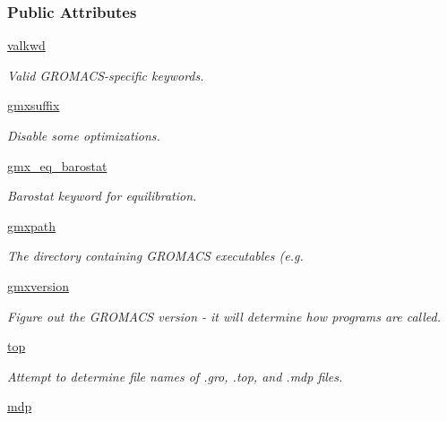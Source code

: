\subsubsection*{Public Attributes}
\begin{DoxyCompactItemize}
\item 
\hyperlink{classsrc_1_1gmxio_1_1GMX_a73bfdd122081f5fa7bd1b969f8c0992b}{valkwd}
\begin{DoxyCompactList}\small\item\em Valid G\+R\+O\+M\+A\+C\+S-\/specific keywords. \end{DoxyCompactList}\item 
\hyperlink{classsrc_1_1gmxio_1_1GMX_a0a5328567ebce344ddc08d82789b2d01}{gmxsuffix}
\begin{DoxyCompactList}\small\item\em Disable some optimizations. \end{DoxyCompactList}\item 
\hyperlink{classsrc_1_1gmxio_1_1GMX_a92135a30fa70b53aafdcb5984c3479a8}{gmx\+\_\+eq\+\_\+barostat}
\begin{DoxyCompactList}\small\item\em Barostat keyword for equilibration. \end{DoxyCompactList}\item 
\hyperlink{classsrc_1_1gmxio_1_1GMX_a28ec53794f4ef9449e39029677e5114c}{gmxpath}
\begin{DoxyCompactList}\small\item\em The directory containing G\+R\+O\+M\+A\+CS executables (e.\+g. \end{DoxyCompactList}\item 
\hyperlink{classsrc_1_1gmxio_1_1GMX_a8c2ec3cee34d56ee3e77d60990a8185e}{gmxversion}
\begin{DoxyCompactList}\small\item\em Figure out the G\+R\+O\+M\+A\+CS version -\/ it will determine how programs are called. \end{DoxyCompactList}\item 
\hyperlink{classsrc_1_1gmxio_1_1GMX_acc200558ac0436547d74efde5f057964}{top}
\begin{DoxyCompactList}\small\item\em Attempt to determine file names of .gro, .top, and .mdp files. \end{DoxyCompactList}\item 
\hyperlink{classsrc_1_1gmxio_1_1GMX_af9738ed7d8f41cbf3287e2688bcb708d}{mdp}
\item 

\end{DoxyCompactItemize}
